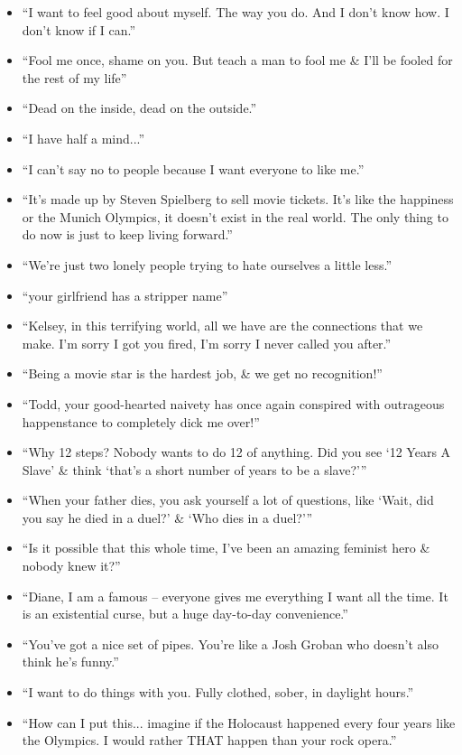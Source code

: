 \documentclass{article}
\begin{document}
\begin{enumerate}
\begin{itemize}
    	\item ``I want to feel good about myself. The way you do. And I don't know how. I don't know if I can.''
    	\item ``Fool me once, shame on you. But teach a man to fool me \& I'll be fooled for the rest of my life''
    	\item ``Dead on the inside, dead on the outside.''
    	\item ``I have half a mind...''
    	\item ``I can't say no to people because I want everyone to like me.''
    	\item ``It's made up by Steven Spielberg to sell movie tickets. It's like the happiness or the Munich Olympics, it doesn't exist in the real world. The only thing to do now is just to keep living forward.''
    	\item ``We're just two lonely people trying to hate ourselves a little less.''
    	\item ``your girlfriend has a stripper name''
    	\item ``Kelsey, in this terrifying world, all we have are the connections that we make. I'm sorry I got you fired, I'm sorry I never called you after.''
    	\item ``Being a movie star is the hardest job, \& we get no recognition!''
    	\item ``Todd, your good-hearted naivety has once again conspired with outrageous happenstance to completely dick me over!''
    	\item ``Why 12 steps? Nobody wants to do 12 of anything. Did you see `12 Years A Slave' \& think `that's a short number of years to be a slave?'''
    	\item ``When your father dies, you ask yourself a lot of questions, like `Wait, did you say he died in a duel?' \& `Who dies in a duel?'''
    	\item ``Is it possible that this whole time, I've been an amazing feminist hero \& nobody knew it?''
    	\item ``Diane, I am a famous -- everyone gives me everything I want all the time. It is an existential curse, but a huge day-to-day convenience.''
    	\item ``You've got a nice set of pipes. You're like a Josh Groban who doesn't also think he's funny.''
    	\item ``I want to do things with you. Fully clothed, sober, in daylight hours.''
    	\item ``How can I put this... imagine if the Holocaust happened every four years like the Olympics. I would rather THAT happen than your rock opera.''

\end{itemize}
\end{enumerate}
\end{document}
